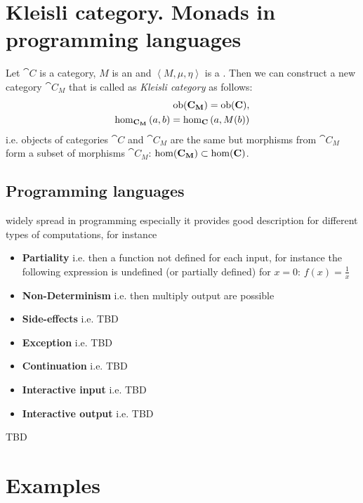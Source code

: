 \section{Kleisli category. Monads in programming languages}

\begin{definition}
\label{def:kleisli_category}
Let $\cat{C}$ is a category, $M$ is an  and
$\left<M, \mu, \eta\right>$ is a . Then we can
construct a new category $\cat{C_M}$ that is called as \textit{Kleisli
  category} as follows:
\begin{eqnarray}
\mathrm{ob}(\mathbf{C_M}) = \mathrm{ob}(\mathbf{C}),
\nonumber \\
\hom_{\mathbf{C_M}}\left(a, b\right) = 
\hom_{\mathbf{C}}\left(a, M(b)\right)
\nonumber
\end{eqnarray}
i.e. objects of categories $\cat{C}$ and $\cat{C_M}$ are the same but
morphisms from $\cat{C_M}$ form a subset of morphisms $\cat{C_M}$:
$\mathrm{hom}(\mathbf{C_M}) \subset \mathrm{hom}(\mathbf{C})$.
\end{definition}

\subsection{Programming languages}
 widely spread in programming
especially it provides good description for different types of
computations, for instance \cite{bib:Moggi91, bib:milewski2018category} 
\begin{itemize}
\item \textbf{Partiality} i.e. then a function not defined for each input, for
  instance the following expression is undefined (or partially
  defined) for $x = 0$: $f(x) = \frac{1}{x}$
\item \textbf{Non-Determinism} i.e. then multiply output are possible
\item \textbf{Side-effects} i.e. TBD
\item \textbf{Exception} i.e. TBD
\item \textbf{Continuation} i.e. TBD
\item \textbf{Interactive input} i.e. TBD
\item \textbf{Interactive output} i.e. TBD
\end{itemize}

TBD

\section{Examples}

